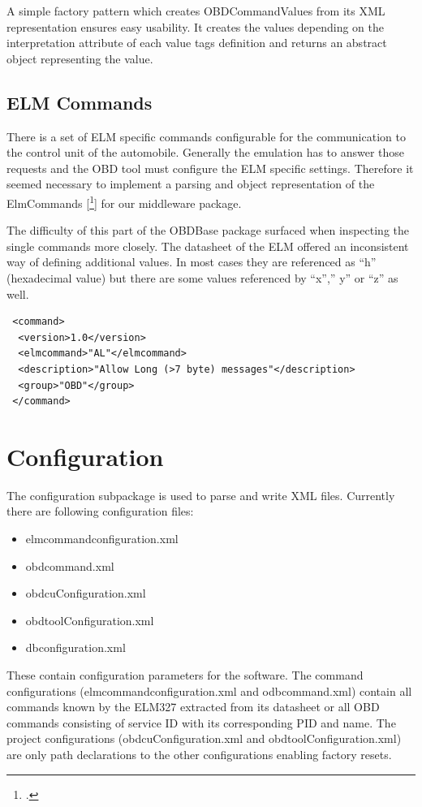 A simple factory pattern which creates OBDCommandValues from its XML representation ensures easy usability. It creates the values depending on 
the interpretation attribute of each value tags definition and returns an abstract object representing the value. 

\subsection{ELM Commands}
\label{sec:ELM}
There is a set of ELM specific commands configurable for the communication to the control unit of the automobile. Generally the emulation has to 
answer those requests and the OBD tool must configure the ELM specific settings. Therefore it seemed necessary to implement a parsing and object 
representation of the ElmCommands [\footcite{ELMDATASHEET}] for our middleware package.

The difficulty of this part of the OBDBase package surfaced when inspecting the single commands more closely. The datasheet of the ELM offered 
an inconsistent way of defining additional values. In most cases they are referenced as “h” (hexadecimal value) but there are some values 
referenced by “x”,” y” or “z” as well.

\begin{verbatim}
 <command>
  <version>1.0</version>
  <elmcommand>"AL"</elmcommand>
  <description>"Allow Long (>7 byte) messages"</description> 
  <group>"OBD"</group>
 </command>
\end{verbatim}

\section{Configuration}
\label{sec:configuration}
The configuration subpackage is used to parse and write XML files. Currently there are following configuration files: 

\begin{itemize}
 \item elmcommandconfiguration.xml
 \item obdcommand.xml
 \item obdcuConfiguration.xml
 \item obdtoolConfiguration.xml
 \item dbconfiguration.xml
\end{itemize}

These contain configuration parameters for the software. The command configurations (elmcommandconfiguration.xml and odbcommand.xml) contain all 
commands known by the ELM327 extracted from its datasheet or all OBD commands consisting of service ID with its corresponding PID and name. 
The project configurations (obdcuConfiguration.xml and obdtoolConfiguration.xml) are only path declarations to the other configurations enabling 
factory resets.

